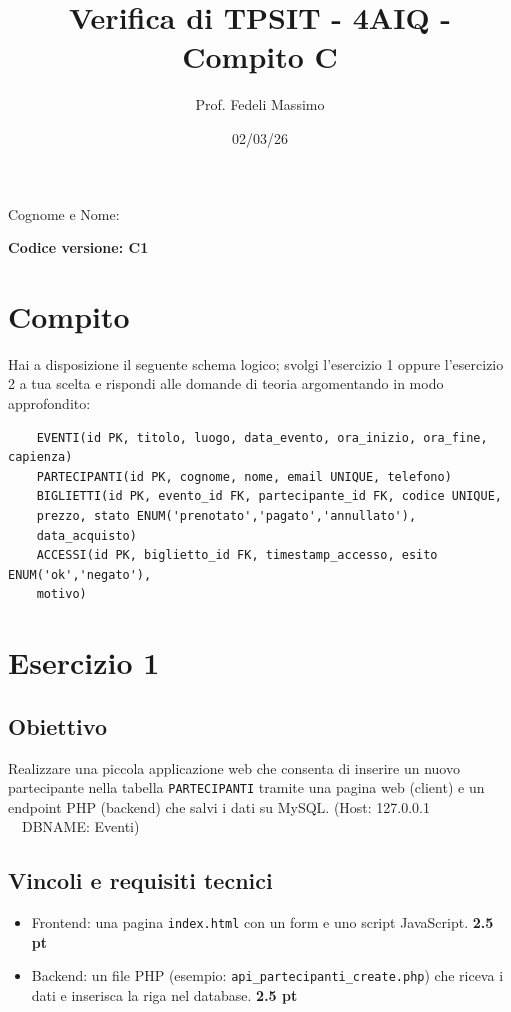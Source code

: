\documentclass[a4paper,12pt]{article}
\title{Verifica di TPSIT - 4AIQ - Compito C}
\author{Prof. Fedeli Massimo}
\date{02/03/26}
\newcommand{\VersionCode}{C1}
\begin{document}
\maketitle
Cognome e Nome:

\vspace{0.15cm}
\noindent\textbf{Codice versione: \VersionCode}

\section*{Compito}

Hai a disposizione il seguente schema logico; svolgi l'esercizio 1 oppure l'esercizio 2 a tua scelta e rispondi alle domande di teoria
argomentando in modo approfondito:

\begin{verbatim}
	EVENTI(id PK, titolo, luogo, data_evento, ora_inizio, ora_fine, capienza)
	PARTECIPANTI(id PK, cognome, nome, email UNIQUE, telefono)
	BIGLIETTI(id PK, evento_id FK, partecipante_id FK, codice UNIQUE,
	prezzo, stato ENUM('prenotato','pagato','annullato'),
	data_acquisto)
	ACCESSI(id PK, biglietto_id FK, timestamp_accesso, esito ENUM('ok','negato'),
	motivo)
\end{verbatim}

\section*{Esercizio 1}

\subsection*{Obiettivo}

Realizzare una piccola applicazione web che consenta di inserire un nuovo partecipante
nella tabella \texttt{PARTECIPANTI} tramite una pagina web (client) e un endpoint PHP
(backend) che salvi i dati su MySQL. (Host: 127.0.0.1 \ \ DBNAME: Eventi)

\subsection*{Vincoli e requisiti tecnici}

\begin{itemize}
	\item Frontend: una pagina \texttt{index.html} con un form e uno script JavaScript. \textbf{2.5 pt}
	\item Backend: un file PHP (esempio: \texttt{api\_partecipanti\_create.php}) che riceva i dati e inserisca la riga nel database. \textbf{2.5 pt}
\end{itemize}
\end{document}
